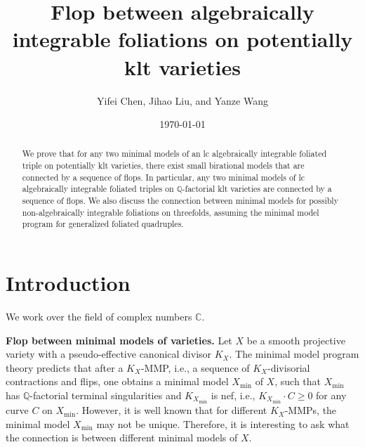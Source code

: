 \documentclass[11pt]{amsart}
\numberwithin{equation}{section}
\newcommand{\Qq}{\mathbb{Q}}
\theoremstyle{definition}
\theoremstyle{definition}
\theoremstyle{definition}
\begin{document}
\title{Flop between algebraically integrable foliations on potentially klt varieties}
\author{Yifei Chen, Jihao Liu, and Yanze Wang}

\date{\today}

\address{Hua Loo-Keng Key Laboratory of Mathematics and Academy of Mathematics and Systems Science, Chinese Academy of Sciences, No. 55 Zhonguancun East Road, Haidian District, Beijing, 100190, China}


\address{Department of Mathematics, Peking University, No. 5 Yiheyuan Road, Haidian District, Peking 100871, China}

\address{Academy of Mathematics and Systems Science, Chinese Academy of Sciences, No. 55 Zhonguancun East Road, Haidian District, Beijing, 100190, China}


\pagestyle{myheadings}

\begin{abstract}
We prove that for any two minimal models of an lc algebraically integrable foliated triple on potentially klt varieties, there exist small birational models that are connected by a sequence of flops. In particular, any two minimal models of lc algebraically integrable foliated triples on $\Qq$-factorial klt varieties are connected by a sequence of flops. We also discuss the connection between minimal models for possibly non-algebraically integrable foliations on threefolds, assuming the minimal model program for generalized foliated quadruples.
\end{abstract}

\maketitle

\tableofcontents

\section{Introduction}\label{sec: Introduction}

We work over the field of complex numbers $\mathbb C$.

\medskip


\noindent\textbf{Flop between minimal models of varieties.} Let $X$ be a smooth projective variety with a pseudo-effective canonical divisor $K_X$. The minimal model program theory predicts that after a $K_X$-MMP, i.e., a sequence of $K_X$-divisorial contractions and flips, one obtains a minimal model $X_{\min}$ of $X$, such that $X_{\min}$ has $\mathbb{Q}$-factorial terminal singularities and $K_{X_{\min}}$ is nef, i.e., $K_{X_{\min}} \cdot C \geq 0$ for any curve $C$ on $X_{\min}$. However, it is well known that for different $K_X$-MMPs, the minimal model $X_{\min}$ may not be unique. Therefore, it is interesting to ask what the connection is between different minimal models of $X$.
\end{document}
